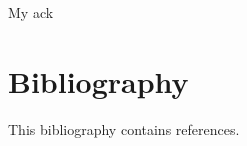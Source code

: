 \documentclass[12pt]{cmuthesis}
\begin{document}
\begin{acknowledgments}
My ack
\end{acknowledgments}

\pagestyle{plain}

\tableofcontents
{}
\listoffigures
{}
\listoftables
\listofalgorithms

\mainmatter




% 
% 

% 
% 
% 

% 

\chapter*{Bibliography}

\vspace{-25mm}
This bibliography contains  references.
\vspace{10mm}

\printbibliography[heading=none]
\end{document}

